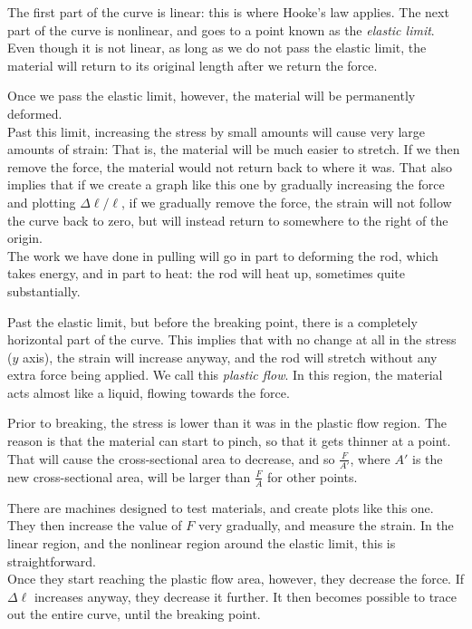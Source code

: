 The first part of the curve is linear: this is where Hooke's law applies. The next part of the curve is nonlinear, and goes to a point known as the \emph{elastic limit}. Even though it is not linear, as long as we do not pass the elastic limit, the material will return to its original length after we return the force.

Once we pass the elastic limit, however, the material will be permanently deformed.\\
Past this limit, increasing the stress by small amounts will cause very large amounts of strain: That is, the material will be much easier to stretch. If we then remove the force, the material would not return back to where it was. That also implies that if we create a graph like this one by gradually increasing the force and plotting $\Delta \ell/\ell$, if we gradually remove the force, the strain will not follow the curve back to zero, but will instead return to somewhere to the right of the origin.\\
The work we have done in pulling will go in part to deforming the rod, which takes energy, and in part to heat: the rod will heat up, sometimes quite substantially.

Past the elastic limit, but before the breaking point, there is a completely horizontal part of the curve. This implies that with no change at all in the stress ($y$ axis), the strain will increase anyway, and the rod will stretch without any extra force being applied. We call this \emph{plastic flow}. In this region, the material acts almost like a liquid, flowing towards the force.

Prior to breaking, the stress is lower than it was in the plastic flow region. The reason is that the material can start to pinch, so that it gets thinner at a point. That will cause the cross-sectional area to decrease, and so $\displaystyle \frac{F}{A'}$, where $A'$ is the new cross-sectional area, will be larger than $\displaystyle \frac{F}{A}$ for other points.

There are machines designed to test materials, and create plots like this one. They then increase the value of $F$ very gradually, and measure the strain. In the linear region, and the nonlinear region around the elastic limit, this is straightforward.\\
Once they start reaching the plastic flow area, however, they decrease the force. If $\Delta \ell$ increases anyway, they decrease it further. It then becomes possible to trace out the entire curve, until the breaking point.

